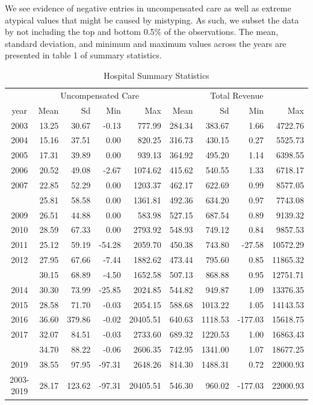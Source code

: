 \documentclass[
  12pt,
]{article}
\begin{document}
We see evidence of negative entries in uncompensated care as well as
extreme atypical values that might be caused by mistyping. As such, we
subset the data by not including the top and bottom 0.5\% of the
observations. The mean, standard deviation, and minimum and maximum
values across the years are presented in table 1 of summary statistics.

\begin{longtable}[t]{crrrrrrrr}
\caption{\label{tab:Tab-1}Hospital Summary Statistics}\\
\toprule
\multicolumn{1}{c}{ } & \multicolumn{4}{c}{Uncompensated Care} & \multicolumn{4}{c}{Total Revenue} \\
\cmidrule(l{3pt}r{3pt}){2-5} \cmidrule(l{3pt}r{3pt}){6-9}
year & Mean & Sd & Min & Max & Mean & Sd & Min & Max\\
\midrule
2003 & 13.25 & 30.67 & -0.13 & 777.99 & 284.34 & 383.67 & 1.66 & 4722.76\\
2004 & 15.16 & 37.51 & 0.00 & 820.25 & 316.73 & 430.15 & 0.27 & 5525.73\\
2005 & 17.31 & 39.89 & 0.00 & 939.13 & 364.92 & 495.20 & 1.14 & 6398.55\\
2006 & 20.52 & 49.08 & -2.67 & 1074.62 & 415.62 & 540.55 & 1.33 & 6718.17\\
2007 & 22.85 & 52.29 & 0.00 & 1203.37 & 462.17 & 622.69 & 0.99 & 8577.05\\
\addlinespace
2008 & 25.81 & 58.58 & 0.00 & 1361.81 & 492.36 & 634.20 & 0.97 & 7743.08\\
2009 & 26.51 & 44.88 & 0.00 & 583.98 & 527.15 & 687.54 & 0.89 & 9139.32\\
2010 & 28.59 & 67.33 & 0.00 & 2793.92 & 548.93 & 749.12 & 0.84 & 9857.53\\
2011 & 25.12 & 59.19 & -54.28 & 2059.70 & 450.38 & 743.80 & -27.58 & 10572.29\\
2012 & 27.95 & 67.66 & -7.44 & 1882.62 & 473.44 & 795.60 & 0.85 & 11865.32\\
\addlinespace
2013 & 30.15 & 68.89 & -4.50 & 1652.58 & 507.13 & 868.88 & 0.95 & 12751.71\\
2014 & 30.30 & 73.99 & -25.85 & 2024.85 & 544.82 & 949.87 & 1.09 & 13376.35\\
2015 & 28.58 & 71.70 & -0.03 & 2054.15 & 588.68 & 1013.22 & 1.05 & 14143.53\\
2016 & 36.60 & 379.86 & -0.02 & 20405.51 & 640.63 & 1118.53 & -177.03 & 15618.75\\
2017 & 32.07 & 84.51 & -0.03 & 2733.60 & 689.32 & 1220.53 & 1.00 & 16863.43\\
\addlinespace
2018 & 34.70 & 88.22 & -0.06 & 2606.35 & 742.95 & 1341.00 & 1.07 & 18677.25\\
2019 & 38.55 & 97.95 & -97.31 & 2648.26 & 814.30 & 1488.31 & 0.72 & 22000.93\\
2003-2019 & 28.17 & 123.62 & -97.31 & 20405.51 & 546.30 & 960.02 & -177.03 & 22000.93\\
\bottomrule
\end{longtable}
\end{document}
